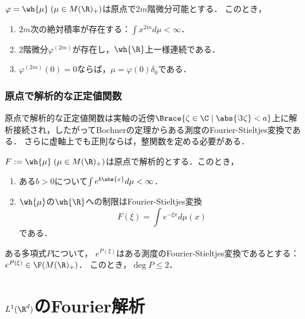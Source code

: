 \documentclass[uplatex,dvipdfmx]{jsreport}
\begin{document}
\begin{proposition}
    $\varphi=\wh{\mu}\;(\mu\in M(\R)_+)$は原点で$2m$階微分可能とする．
    このとき，
    \begin{enumerate}
        \item $2m$次の絶対積率が存在する：$\int x^{2m}d\mu<\infty$．
        \item 2階微分$\varphi^{(2m)}$が存在し，$\wh{\R}$上一様連続である．
        \item $\varphi^{(2m)}(0)=0$ならば，$\mu=\varphi(0)\delta_0$である．
    \end{enumerate}
\end{proposition}

\subsection{原点で解析的な正定値関数}

\begin{tcolorbox}[colframe=ForestGreen, colback=ForestGreen!10!white,breakable,colbacktitle=ForestGreen!40!white,coltitle=black,fonttitle=\bfseries\sffamily,
title=]
    原点で解析的な正定値関数は実軸の近傍$\Brace{\zeta\in\C\mid\abs{\Im\zeta}<a}$上に解析接続され，したがってBochnerの定理からある測度のFourier-Stieltjes変換である．
    さらに虚軸上でも正則ならば，整関数を定める必要がある．
\end{tcolorbox}

\begin{lemma}
    $F:=\wh{\mu}\;(\mu\in M(\R)_+)$は原点で解析的とする．このとき，
    \begin{enumerate}
        \item ある$b>0$について$\int e^{b\abs{x}}d\mu<\infty$．
        \item $\wh{\mu}$の$\wh{\R}$への制限はFourier-Stieltjes変換
        \[F(\xi)=\int e^{-\xi x}d\mu(x)\]
        である．
    \end{enumerate}
\end{lemma}

\begin{theorem}[Marcinkiewiczの定理の特別な場合]
    ある多項式$P$について，
    $e^{P(\xi)}$はある測度のFourier-Stieltjes変換であるとする：$e^{P(\xi)}\in \F(M(\R)_+)$．
    このとき，$\deg P\le 2$．
\end{theorem}

\chapter{$L^1(\R^d)$のFourier解析}
\end{document}
